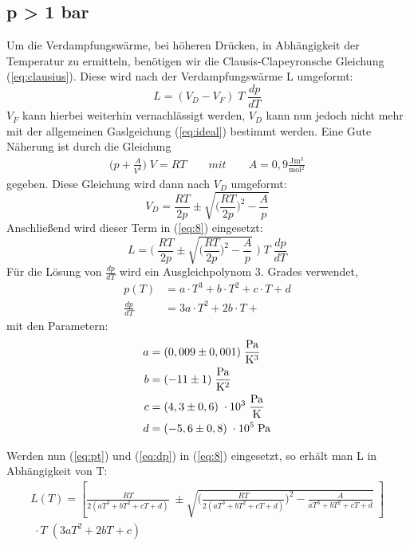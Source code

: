 \subsection{p > 1 bar}
Um die Verdampfungswärme, bei höheren Drücken, in Abhängigkeit der Temperatur zu
ermitteln, benötigen wir die Clausis-Clapeyronsche Gleichung (\ref{eq:clausius}).
Diese wird nach der Verdampfungswärme L umgeformt:
\begin{equation}
  L = (V_D - V_F) \;T\; \frac{dp}{dT} \label{eq:8}
\end{equation}
$V_F$ kann hierbei weiterhin vernachlässigt werden, $V_D$ kann nun jedoch nicht mehr
mit der allgemeinen Gaslgeichung (\ref{eq:ideal}) bestimmt werden.
Eine Gute Näherung ist durch die Gleichung
\begin{align}
  \biggr(p + \frac{A}{V^2}\biggl) \; V = RT \qquad mit \qquad A = 0,9 \frac{\si{\joule \meter^3}}
  {\si{\mol^2}}
\end{align}
gegeben.
Diese Gleichung wird dann nach $V_D$ umgeformt:
\begin{equation}
  V_D = \frac{RT}{2p} \pm \sqrt{\biggr(\frac{RT}{2p}\biggl)^2-\frac{A}{p}}
\end{equation}
Anschließend wird dieser Term in (\ref{eq:8}) eingesetzt:
\begin{equation}
  L = \Biggr(\; \frac{RT}{2p} \pm \sqrt{\biggr(\frac{RT}{2p}\biggl)^2-\frac{A}{p}} \; \Biggl)
  \; T \; \frac{dp}{dT}
\end{equation}
Für die Lösung von $\frac{dp}{dT}$ wird ein Ausgleichpolynom 3. Grades verwendet,
\begin{align}
  p(T) &= a \cdot T^3 + b \cdot T^2 + c \cdot T + d  \label{eq:pt}\\
  \frac{dp}{dT} &= 3a \cdot T^2 + 2b \cdot T +    \label{eq:dp}
\end{align}
mit den Parametern:
\begin{align*}
  a &= (0,009 \pm 0,001) \; \si{\frac{\pascal}{\kelvin^3}} \\
  b &= (-11 \pm 1) \; \si{\frac{\pascal}{\kelvin^2}} \\
  c &= (4,3 \pm 0,6) \; \cdot 10^3 \; \si{\frac{\pascal}{\kelvin}} \\
  d &= (-5,6 \pm 0,8)\; \cdot 10^5 \; \si{\pascal}
\end{align*}


% 

Werden nun (\ref{eq:pt}) und (\ref{eq:dp}) in (\ref{eq:8}) eingesetzt, so erhält man
L in Abhängigkeit von T:
\begin{align*}
  L(T) = \left[\frac{RT}{2 (aT^3+bT^2+cT+d)} \; \pm \sqrt{\biggl(\frac{RT}{2(aT^3+bT^2+cT+d)}\biggr)^2
  -\frac{A}{aT^3+bT^2+cT+d}}\; \right] \\
  \;\cdot T \; (3aT^2+2bT+c)
\end{align*}
% 
% 
